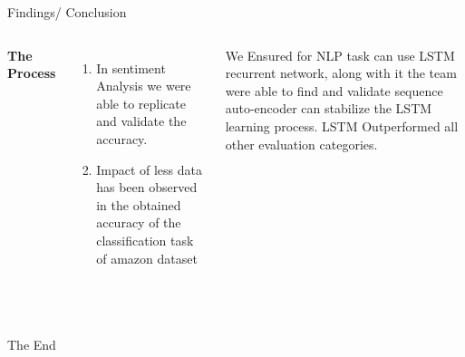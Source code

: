 \documentclass[aspectratio=169,xcolor=dvipsnames]{beamer}
\begin{document}
\begin{frame}{Findings/ Conclusion}
    \tableofcontents

    \begin{columns}[c] %

        \textbf{The Process}
        \begin{enumerate}
            \item In sentiment Analysis we were able to replicate and validate the accuracy.
            \item Impact of less data has been observed in the obtained accuracy of the classification task of amazon dataset
        \end{enumerate}

         We Ensured for NLP task can use LSTM recurrent network, along with it the team were able to find and validate sequence auto-encoder can stabilize the LSTM learning process. LSTM Outperformed all other evaluation categories.

    \end{columns}   \\

\end{frame}

\begin{frame}
    \Huge{\centerline{The End}}
\end{frame}

\end{document}
